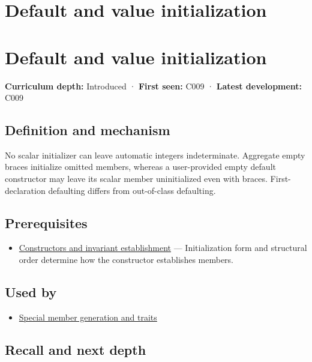 \hypertarget{appendix-ba8c1a9fe03f}{}
\section*{Default and value initialization}
\section{Default and value initialization}\label{appendix-ba8c1a9fe03f-default-and-value-initialization}

\textbf{Curriculum depth:} Introduced · \textbf{First seen:} C009 · \textbf{Latest development:} C009

\subsection{Definition and mechanism}\label{appendix-ba8c1a9fe03f-definition-and-mechanism}

No scalar initializer can leave automatic integers indeterminate. Aggregate empty braces initialize omitted members, whereas a user-provided empty default constructor may leave its scalar member uninitialized even with braces. First-declaration defaulting differs from out-of-class defaulting.

\subsection{Prerequisites}\label{appendix-ba8c1a9fe03f-prerequisites}

\begin{itemize}
\tightlist
\item
  \hyperref[appendix-7f8ec83d0886]{Constructors and invariant establishment} --- Initialization form and structural order determine how the constructor establishes members.
\end{itemize}

\subsection{Used by}\label{appendix-ba8c1a9fe03f-used-by}

\begin{itemize}
\tightlist
\item
  \hyperref[appendix-42e02a12c694]{Special member generation and traits}
\end{itemize}

\subsection{Recall and next depth}\label{appendix-ba8c1a9fe03f-recall-and-next-depth}

